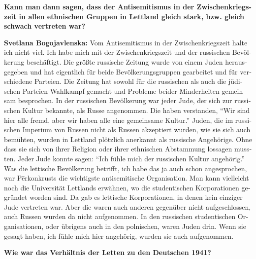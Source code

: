 \begin{otherlanguage}{ngerman}
\textbf{Kann man dann sagen, dass der Antisemitismus in der Zwischenkriegszeit in allen ethnischen Gruppen in Lettland gleich stark, bzw. gleich schwach vertreten war?}

\textbf{Svetlana Bogojavlenska:} Vom Antisemitismus in der Zwischenkriegszeit halte ich nicht viel. Ich habe mich mit der Zwischenkriegszeit und der russischen Bevölkerung beschäftigt. Die größte russische Zeitung wurde von einem Juden herausgegeben und hat eigentlich für beide Bevölkerungsgruppen gearbeitet und für verschiedene Parteien. Die Zeitung hat sowohl für die russischen als auch die jüdischen Parteien Wahlkampf gemacht und Probleme beider Minderheiten gemeinsam besprochen. In der russischen Bevölkerung war jeder Jude, der sich zur russischen Kultur bekannte, als Russe angenommen. Die haben verstanden, "`Wir sind hier alle fremd, aber wir haben alle eine gemeinsame Kultur."' Juden, die im russischen Imperium von Russen nicht als Russen akzeptiert wurden, wie sie sich auch bemühten, wurden in Lettland plötzlich anerkannt als russische Angehörige. Ohne dass sie sich von ihrer Religion oder ihrer ethnischen Abstammung lossagen mussten. Jeder Jude konnte sagen: "`Ich fühle mich der russischen Kultur angehörig."' Was die lettische Bevölkerung betrifft, ich habe das ja auch schon angesprochen, war Pērkonkrusts die wichtigste antisemitische Organisation. Man kann vielleicht noch die Universität Lettlands erwähnen, wo die studentischen Korporationen gegründet worden sind. Da gab es lettische Korporationen, in denen kein einziger Jude vertreten war. Aber die waren auch anderen gegenüber nicht aufgeschlossen, auch Russen wurden da nicht aufgenommen. In den russischen studentischen Organisationen, oder übrigens auch in den polnischen, waren Juden drin. Wenn sie gesagt haben, ich fühle mich hier angehörig, wurden sie auch aufgenommen. 

\textbf{Wie war das Verhältnis der Letten zu den Deutschen 1941?}


\end{otherlanguage}
